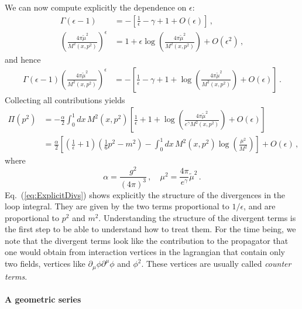 We can now compute explicitly the dependence on $\epsilon$:
\begin{align}
  \Gamma(\epsilon-1) &= -\left[
                       \frac{1}{\epsilon} - \gamma + 1 +O(\epsilon)
                       \right] \, , \\
  \left(\frac{4\pi\tilde{\mu}^2}{M^2(x,p^2)}\right)^\epsilon
                     &= 1 + \epsilon \log
                       \left(\frac{4\pi\tilde{\mu}^2}{M^2(x,p^2)}\right)
                       + O(\epsilon^2)\, ,
\end{align}
and hence
\begin{align}
  \Gamma(\epsilon-1)
  \left(\frac{4\pi\tilde{\mu}^2}{M^2(x,p^2)}\right)^\epsilon
  &= - \left[
    \frac{1}{\epsilon} - \gamma +1 + \log
    \left(\frac{4\pi\tilde{\mu}^2}{M^2(x,p^2)}\right) 
    + O(\epsilon)
    \right]\, .
\end{align}
Collecting all contributions yields
\begin{align}
  \Pi(p^2) &= -\frac{\alpha}{2} \int_0^1 dx\,
             M^2(x,p^2) \left[
             \frac{1}{\epsilon} +1 + \log
             \left(\frac{4\pi\tilde{\mu}^2}{e^\gamma M^2(x,p^2)}\right) 
    + O(\epsilon)
             \right] \\
  \label{eq:ExplicitDivs}
           &= \frac{\alpha}{2} \left[
             \left(\frac{1}{\epsilon}+1\right) \left(\frac{1}{6}
             p^2-m^2\right)
             - \int_0^1dx\, M^2(x,p^2) \log\left(\frac{\mu^2}{M^2}\right)
             \right]
             +O(\epsilon) \, ,
\end{align}
where
\begin{equation}
  \label{eq:DefAlpha}
  \alpha = \frac{g^2}{(4\pi)^3}\, , \quad \mu^2 =
  \frac{4\pi}{e^\gamma} \tilde{\mu}^2\, .
\end{equation}
Eq.~(\ref{eq:ExplicitDivs}) shows explicitly the structure of the
divergences in the loop integral. They are given by the two terms
proportional to $1/\epsilon$, and are proportional to $p^2$ and
$m^2$. Understanding the structure of the divergent terms is the first
step to be able to understand how to treat them. For the time being,
we note that the divergent terms look like the contribution to the
propagator that one would obtain from interaction vertices in the
lagrangian that contain only two fields, \ie vertices like
$\partial_\mu \phi \partial^\mu\phi$ and $\phi^2$. These vertices are
usually called {\em counter terms}.

\paragraph{A geometric series}

